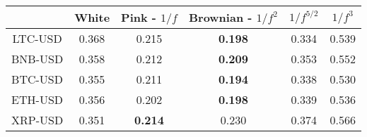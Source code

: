 \begin{tabular}{cccccc}
\toprule
 & White & Pink - $1/f$ & Brownian - $1/f^2$ & $1/f^{5/2}$ & $1/f^3$ \\
\midrule
LTC-USD & 0.368 & 0.215 & \textbf{0.198} & 0.334 & 0.539 \\
BNB-USD & 0.358 & 0.212 & \textbf{0.209} & 0.353 & 0.552 \\
BTC-USD & 0.355 & 0.211 & \textbf{0.194} & 0.338 & 0.530 \\
ETH-USD & 0.356 & 0.202 & \textbf{0.198} & 0.339 & 0.536 \\
XRP-USD & 0.351 & \textbf{0.214} & 0.230 & 0.374 & 0.566 \\
\bottomrule
\end{tabular}
